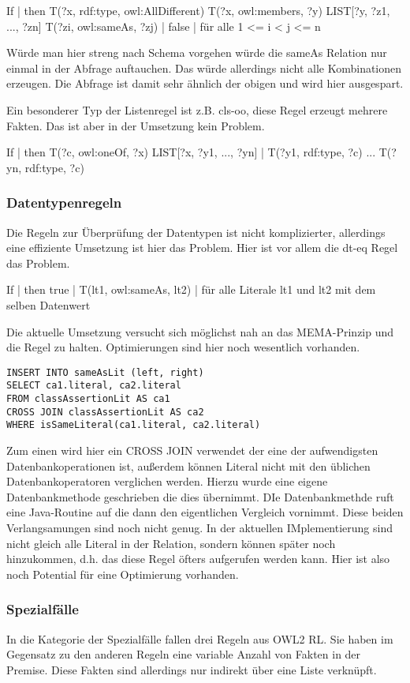 If | then
T(?x, rdf:type, owl:AllDifferent)
T(?x, owl:members, ?y)
LIST[?y, ?z1, ..., ?zn]
T(?zi, owl:sameAs, ?zj) 	          | false 	| für alle 1 <= i < j <= n

Würde man hier streng nach Schema vorgehen würde die sameAs Relation nur einmal in der Abfrage auftauchen. Das würde allerdings nicht alle Kombinationen erzeugen. Die Abfrage ist damit sehr ähnlich der obigen und wird hier ausgespart.

Ein besonderer Typ der Listenregel ist z.B. cls-oo, diese Regel erzeugt mehrere Fakten. Das ist aber in der Umsetzung kein Problem.

If | then
T(?c, owl:oneOf, ?x)
LIST[?x, ?y1, ..., ?yn] 	 | T(?y1, rdf:type, ?c)
								...
								T(?yn, rdf:type, ?c) 

\subsubsection{Datentypenregeln}
Die Regeln zur Überprüfung der Datentypen ist nicht komplizierter, allerdings eine effiziente Umsetzung ist hier das Problem. Hier ist vor allem die dt-eq Regel das Problem.

If | then
true | T(lt1, owl:sameAs, lt2) | für alle Literale lt1 und lt2 mit dem selben Datenwert

Die aktuelle Umsetzung versucht sich möglichst nah an das MEMA-Prinzip und die Regel zu halten. Optimierungen sind hier noch wesentlich vorhanden.

\begin{lstlisting}
INSERT INTO sameAsLit (left, right)
SELECT ca1.literal, ca2.literal
FROM classAssertionLit AS ca1
CROSS JOIN classAssertionLit AS ca2
WHERE isSameLiteral(ca1.literal, ca2.literal)
\end{lstlisting}

Zum einen wird hier ein CROSS JOIN verwendet der eine der aufwendigsten Datenbankoperationen ist, außerdem können Literal nicht mit den üblichen Datenbankoperatoren verglichen werden. Hierzu wurde eine eigene Datenbankmethode geschrieben die dies übernimmt. DIe Datenbankmethde ruft eine Java-Routine auf die dann den eigentlichen Vergleich vornimmt. Diese beiden Verlangsamungen sind noch nicht genug. In der aktuellen IMplementierung sind nicht gleich alle Literal in der Relation, sondern können später noch hinzukommen, d.h. das diese Regel öfters aufgerufen werden kann. Hier ist also noch Potential für eine Optimierung vorhanden.


\subsubsection{Spezialfälle} 
In die Kategorie der Spezialfälle fallen drei Regeln aus OWL2 RL. Sie haben im Gegensatz zu den anderen Regeln eine variable Anzahl von Fakten in der Premise. Diese Fakten sind allerdings nur indirekt über eine Liste verknüpft.
 
